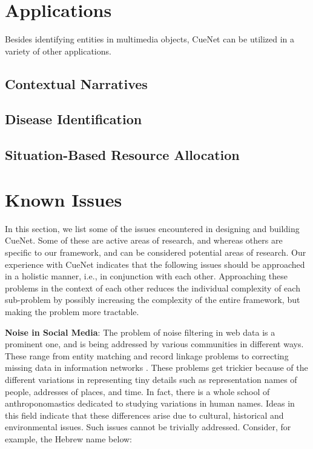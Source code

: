 \section{Applications}
Besides identifying entities in multimedia objects, CueNet can be utilized in a variety of other applications.

\subsection{Contextual Narratives}

\subsection{Disease Identification}

\subsection{Situation-Based Resource Allocation}


\section{Known Issues}
In this section, we list some of the issues encountered in designing and building CueNet. Some of these are active areas of research, and whereas others are specific to our framework, and can be considered potential areas of research. Our experience with CueNet indicates that the following issues should be approached in a holistic manner, i.e., in conjunction with each other. Approaching these problems in the context of each other reduces the individual complexity of each sub-problem by possibly increasing the complexity of the entire framework, but making the problem more tractable.

\textbf{\textbf{Noise in Social Media}}: The problem of noise filtering in web data is a prominent one, and is being addressed by various communities in different ways. These range from entity matching and record linkage problems \cite{elmagarmid2007duplicate} to correcting missing data in information networks \cite{sadikov2011correcting}. These problems get trickier because of the different variations in representing tiny details such as representation names of people, addresses of places, and time. In fact, there is a whole school of anthroponomastics \cite{schneider2009s} dedicated to studying variations in human names. Ideas in this field indicate that these differences arise due to cultural, historical and environmental issues\cite{al2009socio}. Such issues cannot be trivially addressed. Consider, for example, the Hebrew name below:

